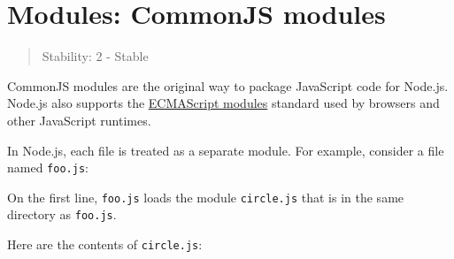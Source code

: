 \section{Modules: CommonJS modules}\label{modules-commonjs-modules}

\begin{quote}
Stability: 2 - Stable
\end{quote}

CommonJS modules are the original way to package JavaScript code for
Node.js. Node.js also supports the \href{esm.md}{ECMAScript modules}
standard used by browsers and other JavaScript runtimes.

In Node.js, each file is treated as a separate module. For example,
consider a file named \texttt{foo.js}:

\begin{Shaded}
\begin{Highlighting}[]
\OperatorTok{=} \NormalTok{(}\NormalTok{)}\OperatorTok{;}
\NormalTok{(}\SpecialCharTok{$\{}\NormalTok{(}\NormalTok{)}\SpecialCharTok{\}}\VerbatimStringTok{\textasciigrave{}}\NormalTok{)}\OperatorTok{;}
\end{Highlighting}
\end{Shaded}

On the first line, \texttt{foo.js} loads the module \texttt{circle.js}
that is in the same directory as \texttt{foo.js}.

Here are the contents of \texttt{circle.js}:

\begin{Shaded}
\begin{Highlighting}[]
\NormalTok{ \{ }\NormalTok{ \} }\OperatorTok{=} \OperatorTok{;}

 \OperatorTok{=}\KeywordTok{=\textgreater{}}  \OperatorTok{*}\OperatorTok{**} \OperatorTok{;}

 \OperatorTok{=}\KeywordTok{=\textgreater{}}  \OperatorTok{*}  \OperatorTok{*}\OperatorTok{;}
\end{Highlighting}
\end{Shaded}

